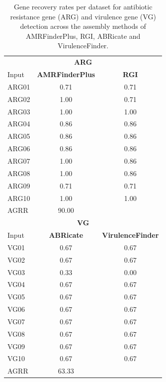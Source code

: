 \begin{table}[!ht]
\centering
\caption{Gene recovery rates per dataset for antibiotic resistance gene (ARG) and virulence gene (VG) detection across the assembly methods of AMRFinderPlus, RGI, ABRicate and VirulenceFinder.}
\label{tab:Table3}

\begin{tabular}[t]{lcc}
\toprule
 &  & \\
\midrule
\multicolumn{3}{c}{\textbf{ARG}} &  & \\
Input & \textbf{AMRFinderPlus} & \textbf{RGI}\\
ARG01 & 0.71 & 0.71\\
ARG02 & 1.00 & 0.71\\
ARG03 & 1.00 & 1.00\\
\addlinespace
ARG04 & 0.86 & 0.86\\
ARG05 & 0.86 & 0.86\\
ARG06 & 0.86 & 0.86\\
ARG07 & 1.00 & 0.86\\
ARG08 & 1.00 & 0.86\\
\addlinespace
ARG09 & 0.71 & 0.71\\
ARG10 & 1.00 & 1.00\\
AGRR & 90.00%
 &  & \\
\multicolumn{3}{c}{\textbf{VG}} &  & \\
\addlinespace
Input & \textbf{ABRicate} & \textbf{VirulenceFinder}\\
VG01 & 0.67 & 0.67\\
VG02 & 0.67 & 0.67\\
VG03 & 0.33 & 0.00\\
VG04 & 0.67 & 0.67\\
\addlinespace
VG05 & 0.67 & 0.67\\
VG06 & 0.67 & 0.67\\
VG07 & 0.67 & 0.67\\
VG08 & 0.67 & 0.67\\
VG09 & 0.67 & 0.67\\
\addlinespace
VG10 & 0.67 & 0.67\\
AGRR & 63.33%
\bottomrule
\end{tabular}
\end{table}
